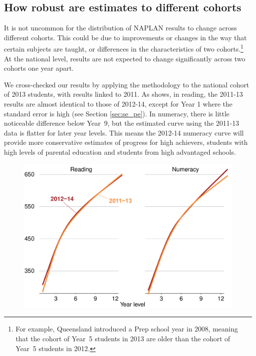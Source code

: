 \subsection{How robust are estimates to different cohorts} \label{sec:cohort1}

It is not uncommon for the distribution of NAPLAN results to change across different cohorts. This could be due to improvements or changes in the way that certain subjects are taught, or differences in the characteristics of two cohorts.\footnote{For example, Queensland introduced a Prep school year in 2008, meaning that the cohort of \mbox{Year 5} students in 2013 are older than the cohort of \mbox{Year 5} students in 2012.} At the national level, results are not expected to change significantly across two cohorts one year apart.

We cross-checked our results by applying the methodology to the national cohort of 2013 students, with results linked to 2011. As  shows, in reading, the 2011-13 results are almost identical to those of 2012-14, except for Year 1 where the standard error is high (see Section \ref{sec:se_pe}). In numeracy, there is little noticeable difference below \mbox{Year 9}, but the estimated curve using the 2011-13 data is flatter for later year levels. This means the 2012-14 numeracy curve will provide more conservative estimates of progress for high achievers, students with high levels of parental education and students from high advantaged schools. 

\begin{figure}[t]
 \includegraphics[width=\columnwidth]{atlas/cyl_2013.pdf}\label{fig:cyl_2013}

\end{figure}

